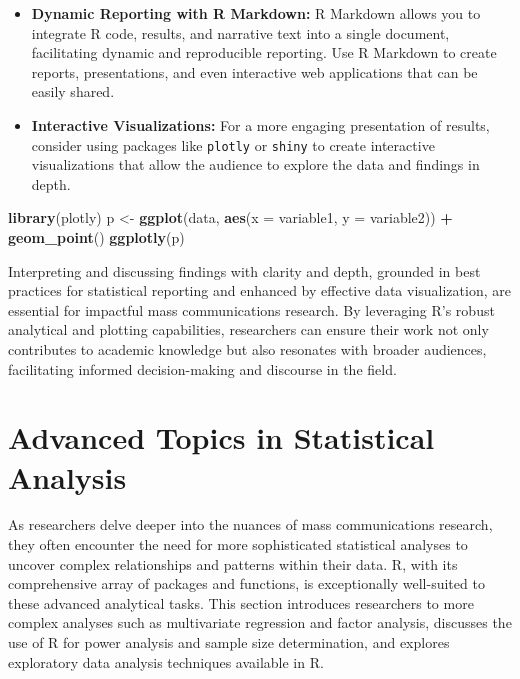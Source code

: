 \documentclass[
]{book}
\newenvironment{Shaded}{\begin{snugshade}}{\end{snugshade}}
\newcommand{\AttributeTok}[1]{\textcolor[rgb]{0.13,0.29,0.53}{#1}}
\newcommand{\FunctionTok}[1]{\textcolor[rgb]{0.13,0.29,0.53}{\textbf{#1}}}
\newcommand{\NormalTok}[1]{#1}
\newcommand{\OtherTok}[1]{\textcolor[rgb]{0.56,0.35,0.01}{#1}}
\newcommand{\SpecialCharTok}[1]{\textcolor[rgb]{0.81,0.36,0.00}{\textbf{#1}}}
\begin{document}
\begin{itemize}
\item
  \textbf{Dynamic Reporting with R Markdown:} R Markdown allows you to integrate R code, results, and narrative text into a single document, facilitating dynamic and reproducible reporting. Use R Markdown to create reports, presentations, and even interactive web applications that can be easily shared.
\item
  \textbf{Interactive Visualizations:} For a more engaging presentation of results, consider using packages like \texttt{plotly} or \texttt{shiny} to create interactive visualizations that allow the audience to explore the data and findings in depth.
\end{itemize}

\begin{Shaded}
\begin{Highlighting}[]
\FunctionTok{library}\NormalTok{(plotly)}
\NormalTok{p }\OtherTok{\textless{}{-}} \FunctionTok{ggplot}\NormalTok{(data, }\FunctionTok{aes}\NormalTok{(}\AttributeTok{x =}\NormalTok{ variable1, }\AttributeTok{y =}\NormalTok{ variable2)) }\SpecialCharTok{+} \FunctionTok{geom\_point}\NormalTok{()}
\FunctionTok{ggplotly}\NormalTok{(p)}
\end{Highlighting}
\end{Shaded}

Interpreting and discussing findings with clarity and depth, grounded in best practices for statistical reporting and enhanced by effective data visualization, are essential for impactful mass communications research. By leveraging R's robust analytical and plotting capabilities, researchers can ensure their work not only contributes to academic knowledge but also resonates with broader audiences, facilitating informed decision-making and discourse in the field.

\hypertarget{advanced-topics-in-statistical-analysis}{%
\section{Advanced Topics in Statistical Analysis}\label{advanced-topics-in-statistical-analysis}}

As researchers delve deeper into the nuances of mass communications research, they often encounter the need for more sophisticated statistical analyses to uncover complex relationships and patterns within their data. R, with its comprehensive array of packages and functions, is exceptionally well-suited to these advanced analytical tasks. This section introduces researchers to more complex analyses such as multivariate regression and factor analysis, discusses the use of R for power analysis and sample size determination, and explores exploratory data analysis techniques available in R.
\end{document}
